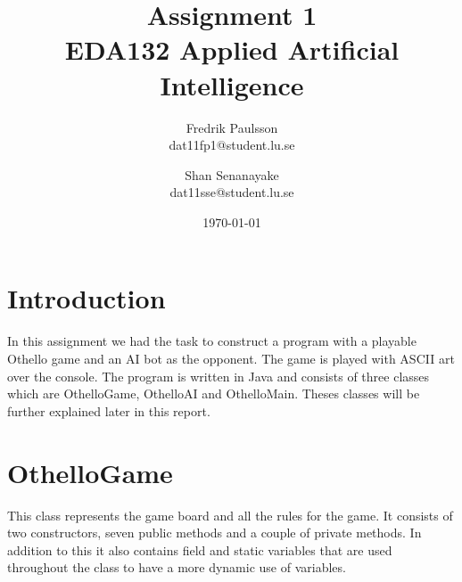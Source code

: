\documentclass[a4paper]{article}
\title{Assignment 1 \\ EDA132 Applied Artificial Intelligence}
\date{\today}
\author{Fredrik Paulsson \\ dat11fp1@student.lu.se \and Shan Senanayake \\ dat11sse@student.lu.se}
\begin{document}
\maketitle


\section{Introduction}
In this assignment we had the task to construct a program with a playable Othello game and an AI bot as the opponent. The game is played with ASCII art over the console. The program is written in Java and consists of three classes which are OthelloGame, OthelloAI and OthelloMain. Theses classes will be further explained later in this report. \\

\section{OthelloGame}
This class represents the game board and all the rules for the game. It consists of two constructors, seven public methods and a couple of private methods. In addition to this it also contains field and static variables that are used throughout the class to have a more dynamic use of variables.
\end{document}

